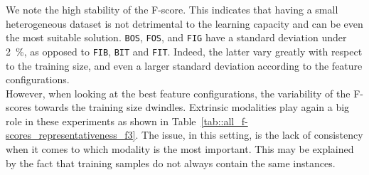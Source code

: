         \begin{figure}[htbp]
        \end{figure}
            
        We note the high stability of the F-score.
        This indicates that having a small heterogeneous dataset is not detrimental to the learning capacity and can be even the most suitable solution.
        \texttt{BOS}, \texttt{FOS}, and \texttt{FIG} have a standard deviation under \SI{2}{\percent}, as opposed to \texttt{FIB}, \texttt{BIT} and \texttt{FIT}.
        Indeed, the latter vary greatly with respect to the training size, and even a larger standard deviation according to the feature configurations.\\

        However, when looking at the best feature configurations, the variability of the F-scores towards the training size dwindles.
        Extrinsic modalities play again a big role in these experiments as shown in Table~\ref{tab::all_f-scores_representativeness_f3}.
        The issue, in this setting, is the lack of consistency when it comes to which modality is the most important.
        This may be explained by the fact that training samples do not always contain the same instances.\\

